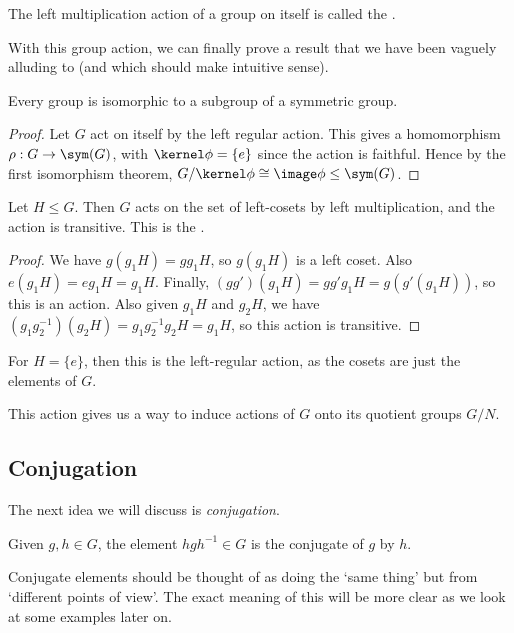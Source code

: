 \documentclass[a4]{scrreprt}
\newcommand{\newsubsection}{\subsection}
\begin{document}
\begin{definition}
	The left multiplication action of a group on itself is called the .
\end{definition}

With this group action, we can finally prove a result that we have been vaguely alluding to (and which should make intuitive sense).

\begin{theorem}
	Every group is isomorphic to a subgroup of a symmetric group. 
\end{theorem}
\begin{proof}
	Let $G$ act on itself by the left regular action. This gives a homomorphism $\rho: G \rightarrow \sym(G)$,
	with $\kernel \phi = \{e\}$ since the action is faithful. Hence by the first isomorphism theorem, $G/\kernel \phi \cong \image\phi \leq \sym(G)$.
\end{proof}

\begin{proposition}
	Let $H \leq G$. Then $G$ acts on the set of left-cosets by left multiplication, and the action is transitive. This is the .
\end{proposition}
\begin{proof}
	We have $g(g_1H) = gg_1 H$, so $g(g_1H)$ is a left coset. Also $e(g_1H) = e g_1 H = g_1 H$. Finally, $(gg')(g_1 H) = g g' g_1 H = g(g'(g_1 H))$, so this is an action. Also given $g_1 H$ and $g_2 H$, we have $(g_1 g_2^{-1})(g_2 H) = g_1 g_2^{-1} g_2 H = g_1 H$, so this action is transitive.
\end{proof}
\begin{remark}
	For $H = \{e\}$, then this is the left-regular action, as the cosets are just the elements of $G$.
\end{remark}
This action gives us a way to induce actions of $G$ onto its quotient groups $G/N$.

\newsubsection{Conjugation}

The next idea we will discuss is \emph{conjugation}.

\begin{definition}[Conugation]
	Given $g, h \in G$, the element $h g h^{-1} \in G$ is the conjugate of $g$ by $h$.
\end{definition}

Conjugate elements should be thought of as doing the `same thing' but from `different points of view'. The exact meaning of this will be more clear as we look at some examples later on.
\end{document}

